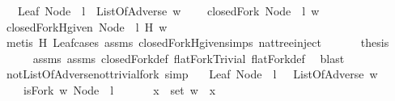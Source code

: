 \begin{isabellebody}
\ \ \ {\isachardoublequoteopen}Leaf\ {\isacharparenleft}Node\ {}\ l{\isacharparenright}{\isachardoublequoteclose}\ \ {\isachardoublequoteopen}ListOfAdverse\ w{\isachardoublequoteclose}\ \isanewline
\ \ \ {\isachardoublequoteopen}closedFork\ {\isacharparenleft}Node\ {}\ l{\isacharparenright}\ w{\isachardoublequoteclose}\isanewline
%
\isadelimproof
%
\endisadelimproof
%
\isatagproof
{}\isamarkupfalse%
\ {\isacharminus}\isanewline
\ \ \isamarkupfalse%
\ {\isachardoublequoteopen}closedFork{\isacharunderscore}Hgiven\ {\isacharparenleft}Node\ {}\ l{\isacharparenright}\ {\isacharparenleft}H\ w{\isacharparenright}{\isachardoublequoteclose}\isanewline
\ \ \ \ \isamarkupfalse%
\ {\isacharparenleft}metis\ H{\isacharunderscore}{}\ Leaf{\isachardot}cases\ assms{\isacharparenleft}{}{\isacharparenright}\ closedFork{\isacharunderscore}Hgiven{\isachardot}simps{\isacharparenleft}{}{\isacharparenright}\ nattree{\isachardot}inject{\isacharparenright}\ \isanewline
\ \ \isamarkupfalse%
\ \isamarkupfalse%
\ {\isacharquery}thesis\isanewline
\ \ \ \ \isamarkupfalse%
\ assms{\isacharparenleft}{}{\isacharparenright}\ assms{\isacharparenleft}{}{\isacharparenright}\ closedFork{\isacharunderscore}def\ flatFork{\isacharunderscore}Trivial\ flatFork{\isacharunderscore}def\ \isamarkupfalse%
\ blast\ \isanewline
{}\isamarkupfalse%
%
\endisatagproof
{\isafoldproof}%
%
\isadelimproof
\isanewline
%
\endisadelimproof
\isanewline
{}\isamarkupfalse%
\ not{\isacharunderscore}ListOfAdverse{\isacharunderscore}not{\isacharunderscore}trivial{\isacharunderscore}fork\ {\isacharbrackleft}simp{\isacharbrackright}{\isacharcolon}\isanewline
\ \ \ {\isachardoublequoteopen}Leaf\ {\isacharparenleft}Node\ {}\ l{\isacharparenright}{\isachardoublequoteclose}\ \ {\isachardoublequoteopen}{\isasymnot}\ ListOfAdverse\ w{\isachardoublequoteclose}\isanewline
\ \ \ {\isachardoublequoteopen}{\isasymnot}\ isFork\ w\ {\isacharparenleft}Node\ {}\ l{\isacharparenright}{\isachardoublequoteclose}\isanewline
%
\isadelimproof
%
\endisadelimproof
%
\isatagproof
{}\isamarkupfalse%
\ {\isacharminus}\isanewline
\ \ \isamarkupfalse%
\ {\isachardoublequoteopen}{\isasymexists}\ x\ {\isasymin}\ set\ w{\isachardot}\ {\isasymnot}\ x{\isachardoublequoteclose}\isanewline

\end{isabellebody}
